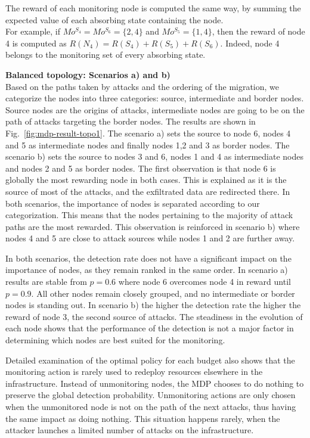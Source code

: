 The reward of each monitoring node is computed the same way, by summing the expected value of each absorbing state containing the node.\\
For example, if $Mo^{S_4} = Mo^{S_6} =\{2,4\}$ and $Mo^{S_5} = \{1,4\}$, then the reward of node 4 is computed as $R(N_4) = R(S_4) + R(S_5) + R(S_6)$. Indeed, node 4 belongs to the monitoring set of every absorbing state.



\textbf{Balanced topology: Scenarios a) and b)\\}
Based on the paths taken by attacks and the ordering of the migration, we categorize the nodes into three categories: source, intermediate and border nodes. Source nodes are the origins of attacks, intermediate nodes are going to be on the path of attacks targeting the border nodes. 
The results are shown in Fig.~\ref{fig:mdp-result-topo1}.
The scenario a) sets the source to node 6, nodes 4 and 5 as intermediate nodes and finally nodes 1,2 and 3 as border nodes.
The scenario b) sets the source to nodes 3 and 6, nodes 1 and 4 as intermediate nodes and nodes 2 and 5 as border nodes.
The first observation is that node 6 is globally the most rewarding node in both cases.
This is explained as it is the source of most of the attacks, and the exfiltrated data are redirected there.
In both scenarios, the importance of nodes is separated according to our categorization. 
This means that the nodes pertaining to the majority of attack paths are the most rewarded.
This observation is reinforced in scenario b) where nodes 4 and 5 are close to attack sources while nodes 1 and 2 are further away.

In both scenarios, the detection rate does not have a significant impact on the importance of nodes, as they remain ranked in the same order.
In scenario a) results are stable from $p=0.6$ where node 6 overcomes node 4 in reward until $p=0.9$. All other nodes remain closely grouped, and no intermediate or border nodes is standing out.
In scenario b) the higher the detection rate the higher the reward of node 3, the second source of attacks.
The steadiness in the evolution of each node shows that the performance of the detection is not a major factor in determining which nodes are best suited for the monitoring. 

Detailed examination of the optimal policy for each budget also shows that the monitoring action is rarely used to redeploy resources elsewhere in the infrastructure.
Instead of unmonitoring nodes, the MDP chooses to do nothing to preserve the global detection probability.
Unmonitoring actions are only chosen when the unmonitored node is not on the path of the next attacks, thus having the same impact as doing nothing. 
This situation happens rarely, when the attacker launches a limited number of attacks on the infrastructure.

